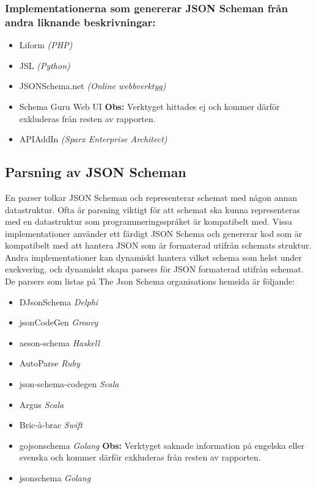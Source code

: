 \subsubsection{Implementationerna som genererar JSON Scheman från andra liknande beskrivningar:}
\begin{itemize}
	\item Liform \textit{(PHP)} \cite{Limenius}
	\item JSL \textit{(Python)} \cite{Romanovich}
	\item JSONSchema.net \textit{(Online webbverktyg)} \cite{Bovet}
	\item Schema Guru Web UI \textbf{Obs:} Verktyget hittades ej och kommer därför exkluderas från resten av rapporten.
	\item APIAddIn \textit{(Sparx Enterprise Architect)} \cite{Tomlinson}
\end{itemize}

\subsection{Parsning av JSON Scheman}
\label{sec:teori:schema-användningsområden:parsning}
En parser tolkar JSON Scheman och representerar schemat med någon annan datastruktur. Ofta är parsning viktigt för att schemat ska kunna representeras med en datastruktur som programmeringsspråket är kompatibelt med. Vissa implementationer använder ett färdigt JSON Schema och genererar kod som är kompatibelt med att hantera JSON som är formaterad utifrån schemats struktur. Andra implementationer kan dynamiskt hantera vilket schema som helst under exekvering, och dynamiskt skapa parsers för JSON formaterad utifrån schemat. De parsers som listas på The Json Schema organisations hemsida är följande:

\begin{itemize}
	\item DJsonSchema \textit{Delphi} \cite{Schlothauer&WauerGmbH}
	\item jsonCodeGen \textit{Groovy} \cite{Schlothauer&WauerGmbHa}
	\item aeson-schema \textit{Haskell} \cite{Kowalczyk}
	\item AutoParse \textit{Ruby} \cite{Googleb}
	\item json-schema-codegen \textit{Scala} \cite{Tundra}
	\item Argus \textit{Scala} \cite{Fenton}
	\item Bric-à-brac \textit{Swift} \cite{GlimpseI/OInc}
	\item gojsonschema \textit{Golang} \textbf{Obs:} Verktyget saknade information på engelska eller svenska och kommer därför exkluderas från resten av rapporten. \cite{Zhangtao}
	\item jsonschema \textit{Golang} \cite{Qriinc.}
\end{itemize}

